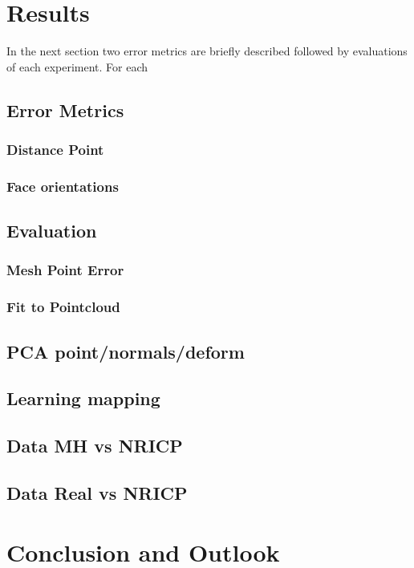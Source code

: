 \chapter{Results}
In the next section two error metrics are briefly described followed by evaluations of each experiment. For each 

\section{Error Metrics}

\subsection{Distance Point}
\subsection{Face orientations}

\section{Evaluation}

\subsection{Mesh Point Error} %

\subsection{Fit to Pointcloud} %

\section{PCA point/normals/deform}

\section{Learning mapping}

\section{Data MH vs NRICP}

\section{Data Real vs NRICP}

\chapter{Conclusion and Outlook}
